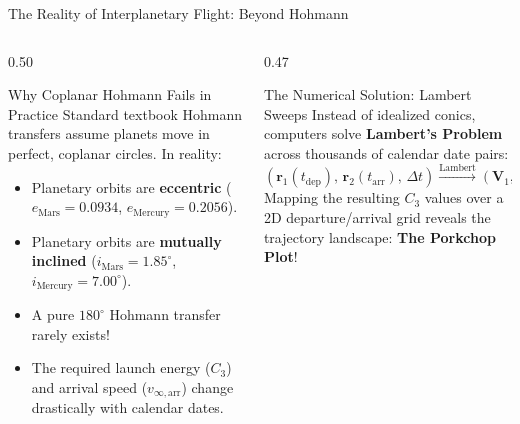 \documentclass[aspectratio=169, 10pt]{beamer}
\begin{document}
\begin{frame}{The Reality of Interplanetary Flight: Beyond Hohmann}
    \begin{columns}[t]
        \begin{column}{0.50\textwidth}
            \begin{block}{Why Coplanar Hohmann Fails in Practice}
                \scriptsize
                Standard textbook Hohmann transfers assume planets move in perfect, coplanar circles. In reality:
                \begin{itemize}\setlength{\itemsep}{1.2pt}
                    \item Planetary orbits are \textbf{eccentric} ($e_{\text{Mars}} = 0.0934$, $e_{\text{Mercury}} = 0.2056$).
                    \item Planetary orbits are \textbf{mutually inclined} ($i_{\text{Mars}} = 1.85^\circ$, $i_{\text{Mercury}} = 7.00^\circ$).
                    \item A pure $180^\circ$ Hohmann transfer rarely exists!
                    \item The required launch energy ($C_3$) and arrival speed ($v_{\infty,\text{arr}}$) change drastically with calendar dates.
                \end{itemize}
            \end{block}
        \end{column}

        \begin{column}{0.47\textwidth}
            \begin{alertblock}{The Numerical Solution: Lambert Sweeps}
                \scriptsize
                Instead of idealized conics, computers solve \textbf{Lambert's Problem} across thousands of calendar date pairs:
                \vspace{-0.08cm}
                \begin{equation*}
                    (\mathbf{r}_1(t_{\text{dep}}), \, \mathbf{r}_2(t_{\text{arr}}), \, \Delta t) \xrightarrow{\text{Lambert}} (\mathbf{V}_1, \, \mathbf{V}_2)
                \end{equation*}
                \vspace{-0.01cm}
                Mapping the resulting $C_3$ values over a 2D departure/arrival grid reveals the trajectory landscape: \textbf{The Porkchop Plot}!
            \end{alertblock}
        \end{column}
    \end{columns}
\end{frame}
\end{document}
